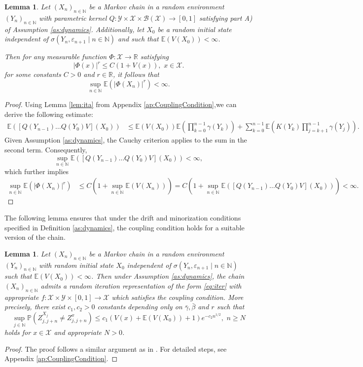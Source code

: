 \documentclass[a4paper,10pt]{article}
\newtheorem{lemma}[theorem]{Lemma}
\newcommand{\N}{\mathbb{N}}
\newcommand{\R}{\mathbb{R}}
\newcommand{\B}{\mathcal{B}}
\newcommand{\X}{\mathcal{X}}
\newcommand{\Y}{\mathcal{Y}}
\renewcommand{\P}{\mathbb{P}}
\newcommand{\E}{\mathbb{E}}
\newcommand{\eps}{\varepsilon}
\newcommand{\ga}{\gamma}
\begin{document}
\begin{lemma}\label{lem:PhiVbound}
	Let $(X_n)_{n\in\N}$ be a Markov chain in a random environment $(Y_n)_{n\in\N}$ with parametric kernel $Q:\Y\times\X\times \B (\X)\to [0,1]$ satisfying part A) of Assumption \ref{as:dynamics}. Additionally, let $X_0$ be a random initial state independent of $\sigma (Y_n,\eps_{n+1}\mid n\in\N)$ and such that $\E (V(X_0))<\infty$.
	
	Then for any measurable function $\Phi:\X\to\R$ satisfying
	\begin{equation*}
	|\Phi (x)|^{r}\le C (1+V(x)),\,\, x\in\X.
	\end{equation*}
	for some constants $C > 0$ and $r\in\R$, it follows that
	$$
	\sup_{n\in\N}\E \left(|\Phi (X_n)|^{r}\right)<\infty.
	$$
\end{lemma}
\begin{proof}
Using Lemma \ref{lem:ita} from Appendix \ref{ap:CouplingCondition},we can derive the following estimate:
\begin{align*}
	\E ([Q(Y_{n-1})\ldots Q(Y_0)V](X_0))&\le \E (V(X_0))\E \left(\prod_{k=0}^{n-1}\ga (Y_k)\right)
	+\sum_{k=0}^{n-1}\E \left(K(Y_k)\prod_{j=k+1}^{n-1}\ga (Y_j)\right).
\end{align*}
Given Assumption \ref{as:dynamics}, the Cauchy criterion applies to the sum in the second term. Consequently,
$$
\sup_{n\in\N}	\E ([Q(Y_{n-1})\ldots Q(Y_0)V](X_0))<\infty,
$$
which further implies
\begin{align*}
	\sup_{n\in\N}\E \left(|\Phi (X_n)|^{r}\right)&\le  C (1+\sup_{n\in\N}\E (V(X_n)))=
	C (1+\sup_{n\in\N}\E ([Q(Y_{n-1})\ldots Q(Y_0)V](X_0)))
<\infty.
\end{align*}	
\end{proof}

The following lemma ensures that under the drift and minorization conditions specified in Definition \ref{as:dynamics}, the coupling condition holds for a suitable version of the chain.
\begin{lemma}\label{lem:MCREmixing}
	Let $(X_n)_{n\in\N}$ be a Markov chain in a random environment $(Y_n)_{n\in\N}$ with
	random initial state $X_0$ independent of $\sigma (Y_n,\eps_{n+1}\mid n\in\N)$ such that $\E (V(X_0))<\infty$.
	Then under Assumption \ref{as:dynamics}, the chain $(X_n)_{n\in\N}$ admits a random iteration representation of the form \eqref{eq:iter} with appropriate $f:\X\times \Y \times [0,1]\to\X$ which satisfies the coupling condition. More precisely, there exist $c_1,c_2>0$ constants depending only on $\bar{\ga},\bar{\beta}$ and $r$ such that
	$$
	\sup_{j\in\N}\P \left(Z_{j,j+n}^{X_j}\ne Z_{j,j+n}^{x}\right)
	\le c_1 \left(V(x)+\E(V(X_0))+1\right)e^{-c_2n^{1/2}},
	\,\,
	n\ge N
	$$	
	holds for $x\in\X$ and appropriate $N>0$.
\end{lemma}
\begin{proof}
The proof follows a similar argument as in \cite{lovasCLT}. For detailed steps, see Appendix \ref{ap:CouplingCondition}.
\end{proof}
\end{document}
